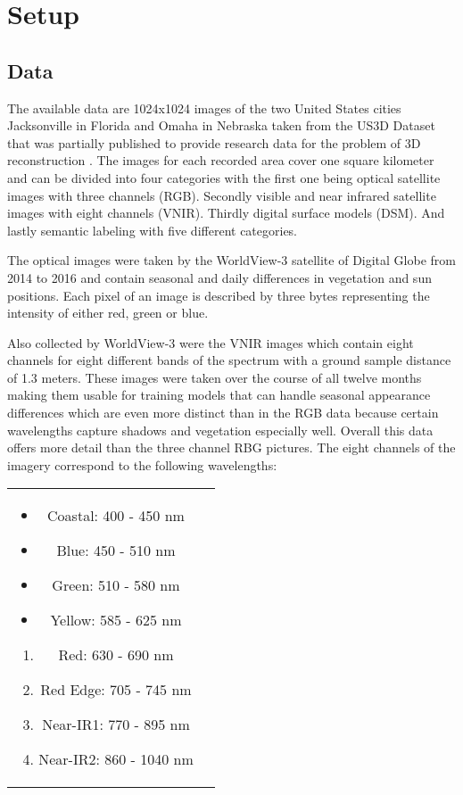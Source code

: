 \section{Setup}

\subsection{Data}

The available data are 1024x1024 images of the two United States cities Jacksonville
in Florida and Omaha in Nebraska taken from the US3D Dataset that
was partially published to provide research data for the problem
of 3D reconstruction \parencite{2019-bosch-semantic}.
The images for each recorded area cover one square kilometer and can be divided 
into four categories with the first one being optical satellite images with three channels (RGB). 
Secondly visible and near infrared satellite images with eight channels (VNIR). 
Thirdly digital surface models (DSM). And lastly semantic labeling with five different categories.
\medskip

The optical images were taken by the WorldView-3 satellite of Digital Globe from 2014 to 2016
and contain seasonal and daily differences in vegetation and sun positions. 
Each pixel of an image is described by three bytes representing the intensity of either red, green or blue.

Also collected by WorldView-3 were the VNIR images which contain eight channels for eight different bands of the spectrum with a ground sample distance of 1.3 meters. These images were taken over the course of all twelve months making them usable for training models that can handle seasonal appearance differences which are even more distinct than in the RGB data because certain wavelengths capture shadows and vegetation especially well. Overall this data offers more detail than the three channel RBG pictures. The eight channels of the imagery correspond to the following wavelengths:

\begin{tabular} {c c}
    \parbox{5cm}{
        \begin{itemize}
            \item Coastal: 400 - 450 nm 			
            \item Blue: 450 - 510 nm			
            \item Green: 510 - 580 nm 			
            \item Yellow: 585 - 625 nm
        \end{itemize}
    }
    \parbox{5cm}{
        \begin{enumerate} 			
            \item Red: 630 - 690 nm
            \item Red Edge: 705 - 745 nm
            \item Near-IR1: 770 - 895 nm
            \item Near-IR2: 860 - 1040 nm
        \end{enumerate}
    }
\end{tabular}
\bigskip

